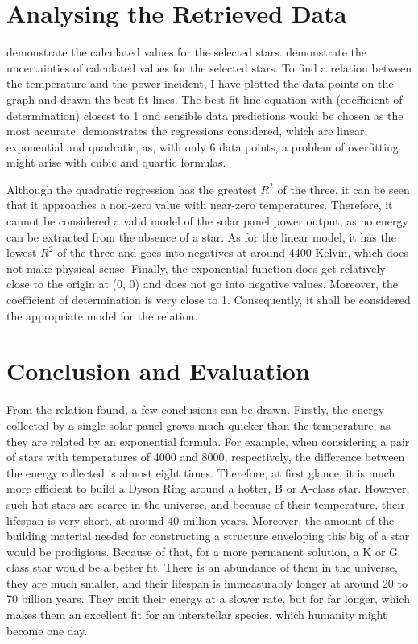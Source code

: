 \documentclass[stu, 11pt, a4paper, floatsintext]{apa7}
\begin{document}
	\section{Analysing the Retrieved Data}
	 demonstrate the calculated values for the selected stars.  demonstrate the uncertainties of calculated values for the selected stars. To find a relation between the temperature and the power incident, I have plotted the data points on the graph and drawn the best-fit lines. The best-fit line equation with  (coefficient of determination) closest to 1 and sensible data predictions would be chosen as the most accurate.  demonstrates the regressions considered, which are linear, exponential and quadratic, as, with only 6 data points, a problem of overfitting might arise with cubic and quartic formulas.
	
	Although the quadratic regression has the greatest $R^2$ of the three, it can be seen that it approaches a non-zero value with near-zero temperatures. Therefore, it cannot be considered a valid model of the solar panel power output, as no energy can be extracted from the absence of a star. As for the linear model, it has the lowest $R^2$ of the three and goes into negatives at around 4400 Kelvin, which does not make physical sense. Finally, the exponential function does get relatively close to the origin at (0, 0) and does not go into negative values. Moreover, the coefficient of determination is very close to 1. Consequently, it shall be considered the appropriate model for the relation.
	\section{Conclusion and Evaluation}
	From the relation found, a few conclusions can be drawn. Firstly, the energy collected by a single solar panel grows much quicker than the temperature, as they are related by an exponential formula. For example, when considering a pair of stars with temperatures of 4000 and 8000, respectively, the difference between the energy collected is almost eight times. Therefore, at first glance, it is much more efficient to build a Dyson Ring around a hotter, B or A-class star. However, such hot stars are scarce in the universe, and because of their temperature, their lifespan is very short, at around 40 million years. Moreover, the amount of the building material needed for constructing a structure enveloping this big of a star would be prodigious. Because of that, for a more permanent solution, a K or G class star would be a better fit. There is an abundance of them in the universe, they are much smaller, and their lifespan is immeasurably longer at around 20 to 70 billion years. They emit their energy at a slower rate, but for far longer, which makes them an excellent fit for an interstellar species, which humanity might become one day.
	
\end{document}
